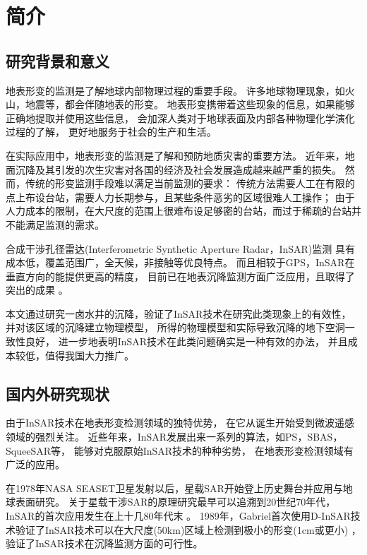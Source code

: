 
\chapter{简介}

\section{研究背景和意义}

地表形变的监测是了解地球内部物理过程的重要手段。
许多地球物理现象，如火山，地震等，都会伴随地表的形变。
地表形变携带着这些现象的信息，如果能够正确地提取并使用这些信息，
会加深人类对于地球表面及内部各种物理化学演化过程的了解，
更好地服务于社会的生产和生活。

在实际应用中，地表形变的监测是了解和预防地质灾害的重要方法。
近年来，地面沉降及其引发的次生灾害对各国的经济及社会发展造成越来越严重的损失。
然而，传统的形变监测手段难以满足当前监测的要求：
传统方法需要人工在有限的点上布设台站，需要人力长期参与，且某些条件恶劣的区域很难人工操作；
由于人力成本的限制，在大尺度的范围上很难布设足够密的台站，而过于稀疏的台站并不能满足监测的需求。

合成干涉孔径雷达(Interferometric Synthetic Aperture Radar，InSAR)监测
具有成本低，覆盖范围广，全天候，非接触等优良特点。
而且相较于GPS，InSAR在垂直方向的能提供更高的精度，%
目前已在地表沉降监测方面广泛应用，且取得了突出的成果
\cite{kimEvolutionSinkholesWink2019a,shiSubsidenceSinkholesWink2019a}。

本文通过研究一卤水井的沉降，验证了InSAR技术在研究此类现象上的有效性，
并对该区域的沉降建立物理模型，
所得的物理模型和实际导致沉降的地下空洞一致性良好，
进一步地表明InSAR技术在此类问题确实是一种有效的办法，
并且成本较低，值得我国大力推广。

\section{国内外研究现状}
由于InSAR技术在地表形变检测领域的独特优势，
在它从诞生开始受到微波遥感领域的强烈关注。
近些年来，InSAR发展出来一系列的算法，如PS，SBAS，SqueeSAR等，
能够对克服原始InSAR技术的种种劣势，
在地表形变检测领域有广泛的应用。

在1978年NASA SEASET卫星发射以后，星载SAR开始登上历史舞台并应用与地球表面研究。
关于星载干涉SAR的原理研究最早可以追溯到20世纪70年代\cite{ziskNewEarthbasedRadar1972}，
InSAR的首次应用发生在上十几80年代末
\cite{zebkerTopographicMappingInterferometric1986,goldsteinInterferometricRadarMeasurement1987}。
1989年，Gabriel首次使用D-InSAR技术验证了InSAR技术可以在大尺度(50km)区域上检测到极小的形变(1cm或更小)
\cite{gabrielMappingSmallElevation1989}，
验证了InSAR技术在沉降监测方面的可行性。

